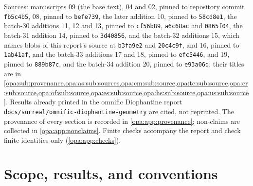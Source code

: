 \documentclass[11pt,oneside]{article}
\numberwithin{equation}{section}
\theoremstyle{definition}
\theoremstyle{remark}
\newcommand{\No}{\mathbf{No}}
\newcommand{\Oz}{\mathbf{Oz}}
\newcommand{\lc}{\operatorname{lc}}
\newcommand{\ct}{\operatorname{ct}}
\newcommand{\fn}[1]{\nolinkurl{#1}}
\begin{document}
\begin{titlepage}
\begin{minipage}{\textwidth}
\begin{abstract}
theorem). Three more parts compute the full formal orbit field of the
constant-term Euler flow, show that the set groups acting faithfully on $\No$ or
$\Oz$ are exactly the left-orderable ones, with prescribed fixed fields, and prove
that every derivation of $\Oz$ integrates to a unique formal Hasse--Schmidt flow. A
tenth part re-derives that classification, adds independence of the orbit of $\omega$
and a proper-class relative fixed field, and solves difference equations for these
automorphisms: $\sigma x-x=b$ exactly when $\ct(b)=0$, $\sigma x/x=a$ exactly when
$\lc(a)=1$, every scalar first-order equation, and cocycles of groups with a central
element.

This report merges fifteen independently written manuscripts, prints shared
results once with every source named, and keeps every source's limitations.
It is an AI-assisted draft: it has not been refereed, and nothing in it has
been formalized in Lean.
\end{abstract}
\end{minipage}
\vfill
\begin{minipage}{\textwidth}
\footnotesize
Sources: manuscripts 09 (the base text), 04 and 02, pinned to repository
commit \texttt{fb5c4b5}, 08, pinned to \texttt{befe739}, the later
addition 10, pinned to \texttt{58cd8e1}, the batch-30 additions 11, 12
and 13, pinned to \texttt{cf56b89}, \texttt{a6c68ac} and \texttt{0865f04},
the batch-31 addition 14, pinned to \texttt{3d40856}, and the batch-32
additions 15, which names blobs of this report's source at \texttt{b3fa9e2} and
\texttt{20c4c9f}, and 16, pinned to \texttt{1ab41af}, and the batch-33 additions 17
and 18, pinned to \texttt{efc5446}, and 19, pinned to \texttt{889b87c}, and the batch-34 addition 20,
pinned to \texttt{e93a06d};
their titles are in \cref{opa:sub:provenance,opa:as:sub:sources,opa:cm:sub:source,opa:tc:sub:source,opa:cr:sub:source,opa:of:sub:source,opa:es:sub:source,opa:hs:sub:source,opa:us:sub:source}. Results already printed in the omnific
Diophantine report \fn{docs/surreal/omnific-diophantine-geometry} are cited,
not reprinted. The provenance of every section is recorded in
\cref{opa:app:provenance}; non-claims are collected in
\cref{opa:app:nonclaims}. Finite checks accompany the report and check finite
identities only (\cref{opa:app:checks}).
\end{minipage}
\end{titlepage}
\hypersetup{pageanchor=true}
{\small\setlength{\parskip}{0pt}\tableofcontents}
\clearpage

\section{Scope, results, and conventions}\label{opa:sec:intro}
\end{document}
